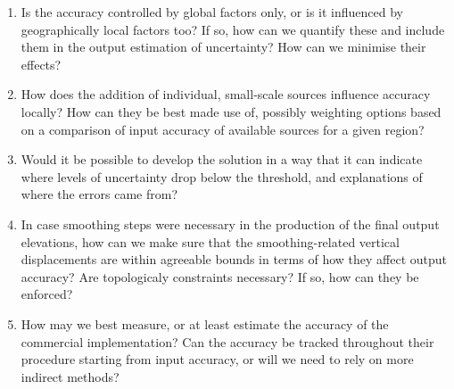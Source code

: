\begin{enumerate}
\begin{enumerate}
        \item Is the accuracy controlled by global factors only, or is it influenced by geographically local factors too? If so, how can we quantify these and include them in the output estimation of uncertainty? How can we minimise their effects?
        \item How does the addition of individual, small-scale sources influence accuracy locally? How can they be best made use of, possibly weighting options based on a comparison of input accuracy of available sources for a given region?
        \item Would it be possible to develop the solution in a way that it can indicate where levels of uncertainty drop below the threshold, and explanations of where the errors came from?
        \item In case smoothing steps were necessary in the production of the final output elevations, how can we make sure that the smoothing-related vertical displacements are within agreeable bounds in terms of how they affect output accuracy? Are topologicaly constraints necessary? If so, how can they be enforced?
        \item How may we best measure, or at least estimate the accuracy of the commercial implementation? Can the accuracy be tracked throughout their procedure starting from input accuracy, or will we need to rely on more indirect methods?
    \end{enumerate}
\end{enumerate}